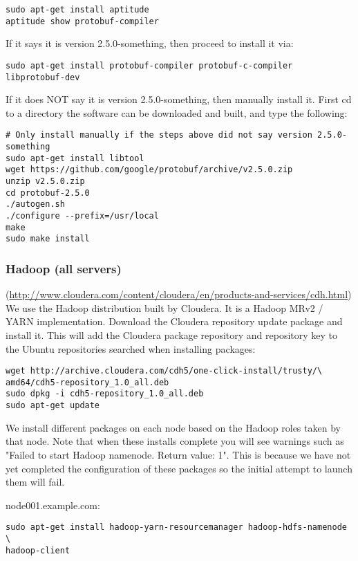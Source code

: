 \begin{verbatim}
sudo apt-get install aptitude
aptitude show protobuf-compiler
\end{verbatim}

If it says it is version 2.5.0-something, then proceed to install it via:

\begin{verbatim}
sudo apt-get install protobuf-compiler protobuf-c-compiler libprotobuf-dev
\end{verbatim}

If it does NOT say it is version 2.5.0-something, then manually install
it.  First cd to a directory the software can be downloaded and built,
and type the following:

\begin{verbatim}
# Only install manually if the steps above did not say version 2.5.0-something
sudo apt-get install libtool
wget https://github.com/google/protobuf/archive/v2.5.0.zip
unzip v2.5.0.zip
cd protobuf-2.5.0
./autogen.sh
./configure --prefix=/usr/local
make
sudo make install
\end{verbatim}


\subsubsection{Hadoop (all servers)} (\url{http://www.cloudera.com/content/cloudera/en/products-and-services/cdh.html})\\
We use the Hadoop distribution built by Cloudera.  It is a Hadoop MRv2 /
YARN implementation.  Download the Cloudera repository update package and
install it.  This will add the Cloudera package repository and repository
key to the Ubuntu repositories searched when installing packages:

\begin{verbatim}
wget http://archive.cloudera.com/cdh5/one-click-install/trusty/\
amd64/cdh5-repository_1.0_all.deb
sudo dpkg -i cdh5-repository_1.0_all.deb
sudo apt-get update
\end{verbatim}

We install different packages on each node based on the Hadoop roles
taken by that node.  Note that when these installs complete you will see
warnings such as "Failed to start Hadoop namenode. Return value: 1".
This is because we have not yet completed the configuration of these
packages so the initial attempt to launch them will fail.

node001.example.com:
\begin{verbatim}
sudo apt-get install hadoop-yarn-resourcemanager hadoop-hdfs-namenode \
hadoop-client
\end{verbatim}


